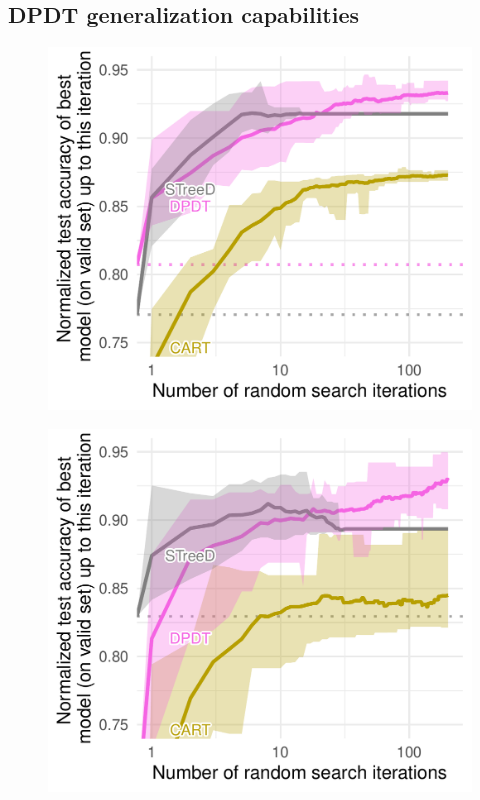 \subsection{DPDT generalization capabilities}\label{sec:generalization}
\begin{figure}
    \centering
    \begin{minipage}{0.24\textwidth}
        \includegraphics[width=\textwidth]{images/figures/tab_bench/random_search_classif_numerical_depth5.pdf}
        \label{fig:gen-num}
    \end{minipage}
    \begin{minipage}{0.24\textwidth}
        \includegraphics[width=\textwidth]{images/figures/tab_bench/random_search_classif_categorical_depth5.pdf}

\end{minipage}
\end{figure}
